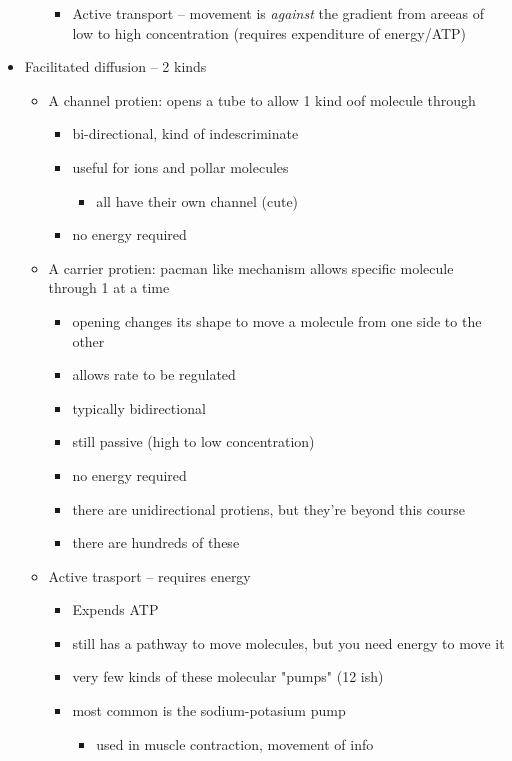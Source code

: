 \documentclass{article}
\theoremstyle{definition}
\begin{document}
\begin{itemize}
\begin{itemize}
\begin{itemize}
					\item Active transport -- movement is \textit{against}  the gradient from areeas of low to high concentration (requires expenditure of energy/ATP)
				\end{itemize}
		\end{itemize}
	\item Facilitated diffusion -- 2 kinds
		\begin{itemize}
			\item A channel protien: opens a tube to allow 1 kind oof molecule through
				\begin{itemize}
					\item bi-directional, kind of indescriminate
					\item useful for ions and pollar molecules
						\begin{itemize}
							\item all have their own channel (cute)
						\end{itemize}
					\item no energy required
				\end{itemize}
			\item A carrier protien: pacman like mechanism allows specific molecule through 1 at a time
				\begin{itemize}
					\item opening changes its shape to move a molecule from one side to the other
					\item allows rate to be regulated
					\item typically bidirectional
					\item still passive (high to low concentration)
					\item no energy required
			\item there are unidirectional protiens, but they're beyond this course
			\item there are hundreds of these
		\end{itemize}
	\item Active trasport -- requires energy
		\begin{itemize}
			\item Expends ATP
			\item still has a pathway to move molecules, but you need energy to move it
			\item very few kinds of these molecular "pumps" (12 ish)
			\item most common is the sodium-potasium pump
				\begin{itemize}
					\item used in muscle contraction, movement of info

\end{itemize}
\end{itemize}
\end{itemize}
\end{itemize}
\end{document}
